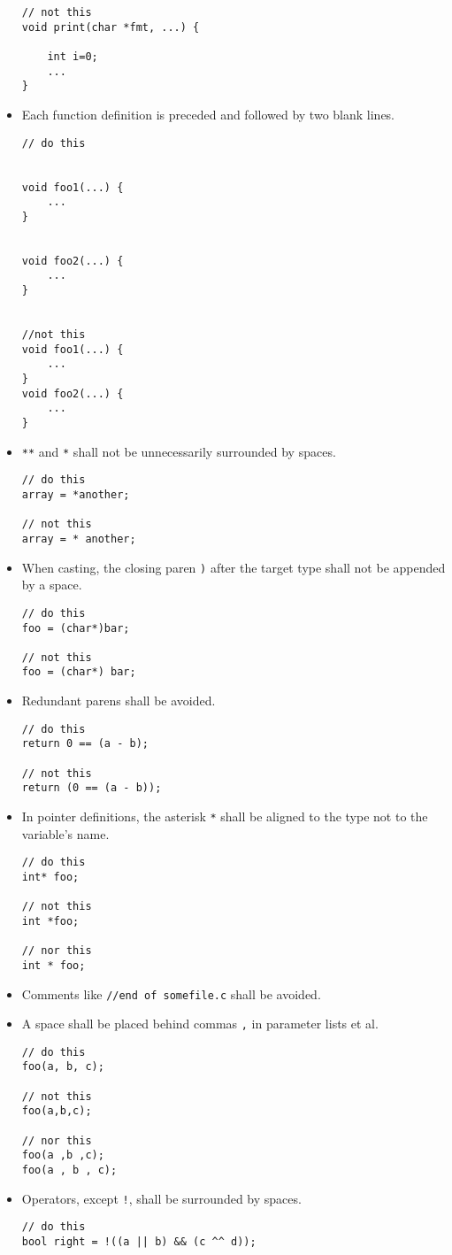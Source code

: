 \begin{itemize}
\begin{lstlisting}
// not this
void print(char *fmt, ...) {

    int i=0;
    ...
}
\end{lstlisting}
\item Each function definition is preceded and followed by two blank lines.
\begin{lstlisting}
// do this


void foo1(...) {
    ...
}


void foo2(...) {
    ...
}


//not this
void foo1(...) {
    ...
}
void foo2(...) {
    ...
}
\end{lstlisting}
\item \lstinline|**| and \lstinline|*| shall not be unnecessarily
  surrounded by spaces.
\begin{lstlisting}
// do this
array = *another;

// not this
array = * another;
\end{lstlisting}
\item When casting, the closing paren \lstinline|)| after the target type shall not
  be appended by a space.
\begin{lstlisting}
// do this
foo = (char*)bar;

// not this
foo = (char*) bar;
\end{lstlisting}
\item Redundant parens shall be avoided.
\begin{lstlisting}
// do this
return 0 == (a - b);

// not this
return (0 == (a - b));
\end{lstlisting}
\item In pointer definitions, the asterisk \lstinline|*| shall be
  aligned to the type not to the variable's name.
\begin{lstlisting}
// do this
int* foo;

// not this
int *foo;

// nor this
int * foo;
\end{lstlisting}
\item Comments like \lstinline|//end of somefile.c| shall be avoided.
\item A space shall be placed behind commas \lstinline|,| in parameter
  lists et al.
\begin{lstlisting}
// do this
foo(a, b, c);

// not this
foo(a,b,c);

// nor this
foo(a ,b ,c);
foo(a , b , c);
\end{lstlisting}
\item Operators, except \lstinline|!|, shall be surrounded by spaces.
\begin{lstlisting}
// do this
bool right = !((a || b) && (c ^^ d));


\end{lstlisting}
\end{itemize}
